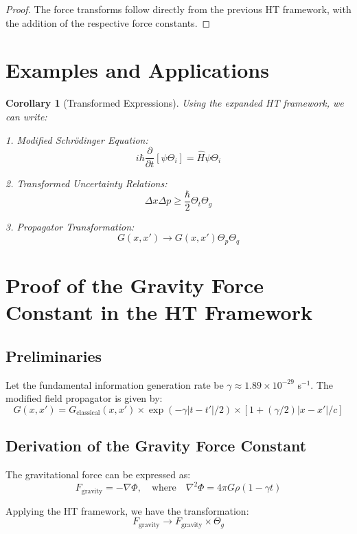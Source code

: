 \documentclass{article}
\theoremstyle{plain}
\newtheorem{corollary}[theorem]{Corollary}
\theoremstyle{definition}
\theoremstyle{remark}
\begin{document}
\begin{proof}
The force transforms follow directly from the previous HT framework, with the addition of the respective force constants.
\end{proof}

\section{Examples and Applications}

\begin{corollary}[Transformed Expressions]
Using the expanded HT framework, we can write:

1. Modified Schrödinger Equation:
\[i\hbar\frac{\partial}{\partial t}[\psi\Theta_i] = \hat{H}\psi\Theta_i\]

2. Transformed Uncertainty Relations:
\[\Delta x\Delta p \geq \frac{\hbar}{2}\Theta_t\Theta_g\]

3. Propagator Transformation:
\[G(x,x') \rightarrow G(x,x')\Theta_p\Theta_q\]
\end{corollary}

\section{Proof of the Gravity Force Constant in the HT Framework}

\subsection{Preliminaries}

Let the fundamental information generation rate be $\gamma \approx 1.89 \times 10^{-29}$ s$^{-1}$. The modified field propagator is given by:
\begin{equation}
G(x,x') = G_\text{classical}(x,x') \times \exp(-\gamma|t-t'|/2) \times \left[1 + (\gamma/2)|x-x'|/c\right]
\end{equation}

\subsection{Derivation of the Gravity Force Constant}

The gravitational force can be expressed as:
\begin{equation}
F_\text{gravity} = -\nabla \Phi, \quad \text{where} \quad \nabla^2 \Phi = 4\pi G \rho(1 - \gamma t)
\end{equation}

Applying the HT framework, we have the transformation:
\begin{equation}
F_\text{gravity} \rightarrow F_\text{gravity} \times \Theta_g
\end{equation}
\end{document}
